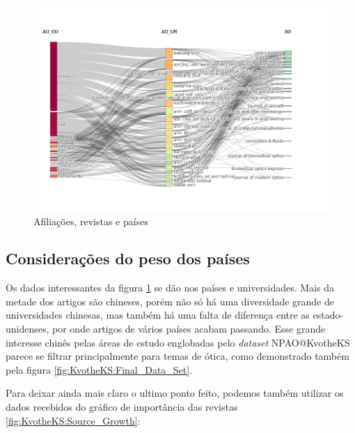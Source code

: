 \begin{figure}[H]
    \centering
    \includegraphics[width=1.1\textwidth]{experiments/KvotheKS/PesqBibliogr/AlgoritmosSimulacaoOptica-Dinamica/WoS-20220202/Dataset/AU_CO_AU_UN_SO.png}
    \caption{Afiliações, revistas e países}
    \label{fig:KvotheKS:SankeyCountry} 
\end{figure}

\subsection{Considerações do peso dos países}
    Os dados interessantes da figura \ref{fig:KvotheKS:SankeyCountry} se dão nos países e universidades. Mais da metade dos artigos são chineses, porém não só há uma diversidade grande de universidades chinesas, mas também há uma falta de diferença entre as estado-unidenses, por onde artigos de vários países acabam passando. Esse grande interesse chinês pelas áreas de estudo englobadas pelo \emph{dataset} NPAO@KvotheKS parece se filtrar principalmente para temas de ótica, como demonstrado também pela figura \ref{fig:KvotheKS:Final_Data_Set}.
    
    Para deixar ainda mais claro o ultimo ponto feito, podemos também utilizar os dados recebidos do gráfico de importância das revistas \ref{fig:KvotheKS:Source_Growth}:
    
